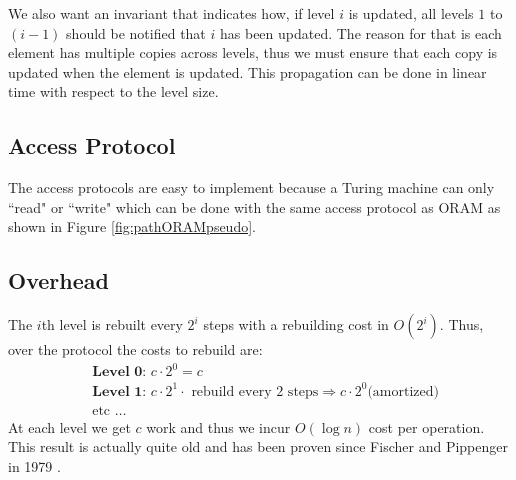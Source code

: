 \documentclass[11pt]{article}
\begin{document}
We also want an invariant that indicates how, if level $i$ is updated, all levels $1$ to $(i-1)$ should be notified that $i$ has been updated. The reason for that is each element has multiple copies across levels, thus we must ensure that each copy is updated when the element is updated. This propagation can be done in linear time with respect to the level size.

\subsection{Access Protocol}
The access protocols are easy to implement because a Turing machine can only ``read" or ``write" which can be done with the same access protocol as ORAM as shown in Figure \ref{fig:pathORAMpseudo}.

\subsection{Overhead}
The $i$th level is rebuilt every $2^i$ steps with a rebuilding cost in $O(2^i)$. Thus, over the protocol the costs to rebuild are:
\begin{align*}
    &\textbf{Level 0: } c \cdot 2^0 = c \\
    &\textbf{Level 1: } c \cdot 2^1\cdot \text{ rebuild every 2 steps} \Rightarrow c \cdot 2^0 \text{(amortized)} \tag{Rebuild cost is linear}\\
    &\text{etc } \dots
\end{align*}
At each level we get $c$ work and thus we incur $O(\log n)$ cost per operation. This result is actually quite old and has been proven since Fischer and Pippenger in 1979 \cite{pippenger1979relations}.

\newpage


\end{document}
